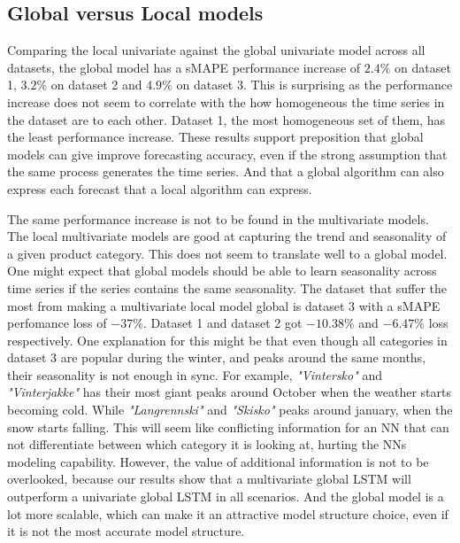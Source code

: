 

\subsection{Global versus Local models}
Comparing the local univariate against the global univariate model across all datasets,
the global model has a sMAPE performance increase of $2.4\%$ on dataset 1, $3.2\%$ on dataset 2 and
$4.9\%$ on dataset 3. This is surprising as the performance increase does not seem to correlate
with the how homogeneous the time series in the dataset are to each other.
Dataset 1, the most homogeneous set of them, has the least performance increase.
These results support \cite{Montero-Manso2021} preposition that global models can give
improve forecasting accuracy, even if the strong assumption that the same process generates the time series.
And that a global algorithm can also express each forecast that a local algorithm can express.

The same performance increase is not to be found in the multivariate models.
The local multivariate models are good at capturing the trend and seasonality of
a given product category. This does not seem to translate well to a global model.
One might expect that global models should be able to learn seasonality across
time series if the series contains the same seasonality.
The dataset that suffer the most from making a multivariate local model global is dataset 3
with a sMAPE perfomance loss of $-37\%$. Dataset 1 and dataset 2 got $-10.38\%$ and $-6.47\%$ loss
respectively.
One explanation for this might be that even though all categories in dataset 3 are popular during the
winter, and peaks around the same months, their seasonality is not enough in sync.
For example, \textit{"Vintersko"} and \textit{"Vinterjakke"} has their most giant peaks around October
when the weather starts becoming cold. While \textit{"Langrennski"} and \textit{"Skisko"}
peaks around january, when the snow starts falling.
This will seem like conflicting information for an NN that can not differentiate between
which category it is looking at, hurting the NNs modeling capability.
However, the value of additional information is not to be overlooked,
because our results show that a multivariate global LSTM will outperform
a univariate global LSTM in all scenarios.
And the global model is a lot more scalable, which can make
it an attractive model structure choice, even if it is not the most
accurate model structure.


